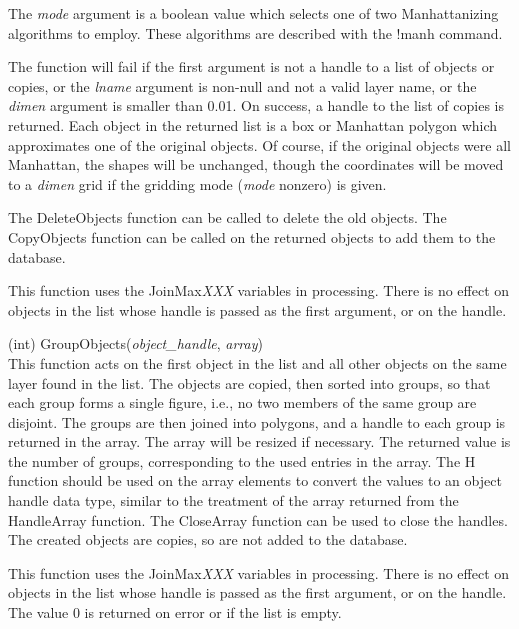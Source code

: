 \begin{description}
The {\it mode} argument is a boolean value which selects one of two
Manhattanizing algorithms to employ.  These algorithms are described
with the {\cb !manh} command.

The function will fail if the first argument is not a handle to a list
of objects or copies, or the {\it lname} argument is non-null and not
a valid layer name, or the {\it dimen} argument is smaller than 0.01. 
On success, a handle to the list of copies is returned.  Each object
in the returned list is a box or Manhattan polygon which approximates
one of the original objects.  Of course, if the original objects were
all Manhattan, the shapes will be unchanged, though the coordinates
will be moved to a {\it dimen} grid if the gridding mode ({\it mode}
nonzero) is given.

The {\vt DeleteObjects} function can be called to delete the old
objects.  The {\vt CopyObjects} function can be called on the returned
objects to add them to the database.

This function uses the {\et JoinMax}{\it XXX} variables in processing. 
There is no effect on objects in the list whose handle is passed as
the first argument, or on the handle.

\item{(int) \vt GroupObjects({\it object\_handle\/}, {\it array\/})}\\
This function acts on the first object in the list and all other
objects on the same layer found in the list.  The objects are copied,
then sorted into groups, so that each group forms a single figure,
i.e., no two members of the same group are disjoint.  The groups are
then joined into polygons, and a handle to each group is returned in
the array.  The array will be resized if necessary.  The returned
value is the number of groups, corresponding to the used entries in
the array.  The {\vt H} function should be used on the array elements
to convert the values to an object handle data type, similar to the
treatment of the array returned from the {\vt HandleArray} function. 
The {\vt CloseArray} function can be used to close the handles.  The
created objects are copies, so are not added to the database.

This function uses the {\et JoinMax}{\it XXX} variables in processing. 
There is no effect on objects in the list whose handle is passed as
the first argument, or on the handle.  The value 0 is returned on
error or if the list is empty.


\end{description}
